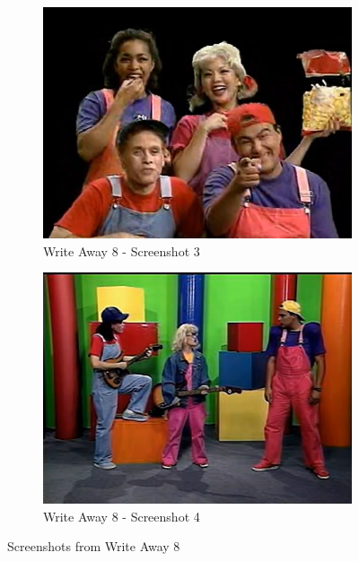 \begin{figure}[H]
    \begin{subfigure}{0.45\textwidth}
        \centering
        \includegraphics[width=\linewidth]{Games/WriteAway/Images/WriteAway8Screenshot3.png}
        \caption{Write Away 8 - Screenshot 3}
    \end{subfigure}
    \begin{subfigure}{0.45\textwidth}
        \centering
        \includegraphics[width=\linewidth]{Games/WriteAway/Images/WriteAway8Screenshot4.png}
        \caption{Write Away 8 - Screenshot 4}
    \end{subfigure}
    \caption{Screenshots from Write Away 8}
\end{figure}

